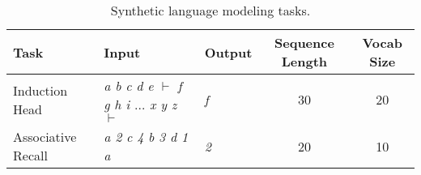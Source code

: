 \begin{table}[h]
    \small
    \centering
    \caption{\label{table:synthetic_tasks} Synthetic language modeling tasks.}
    {
        \begin{tabular}{@{}|l|l|l|c|c|@{}}
        \hline
        Task & Input & Output & Sequence Length & Vocab Size  \\ %
        \hline
        Induction Head & \textit{a b c d e $\vdash$ f g h i $\dots$ x y z $\vdash$} & \textit{f} & 30 & 20 \\
        Associative Recall & \textit{a 2 c 4 b 3 d 1 a} & \textit{2} & 20 & 10 \\ \hline
        \end{tabular}
    }
\end{table}